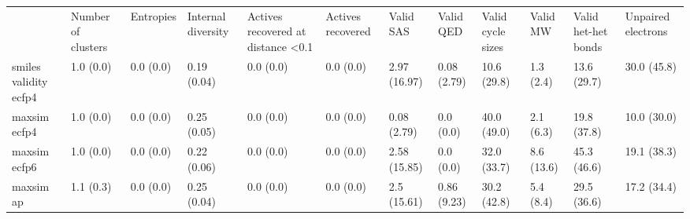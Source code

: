 \begin{tabular}{llllllllllll}
 & Number of clusters & Entropies & Internal diversity & Actives recovered at distance <0.1 & Actives recovered & Valid SAS & Valid QED & Valid cycle sizes & Valid MW & Valid het-het bonds & Unpaired electrons \\
smiles validity ecfp4 & {\cellcolor[HTML]{F6FCFD}} \color[HTML]{000000} 1.0 (0.0) & {\cellcolor[HTML]{F7FCFD}} \color[HTML]{000000} 0.0 (0.0) & {\cellcolor[HTML]{D8F0EF}} \color[HTML]{000000} 0.19 (0.04) & {\cellcolor[HTML]{F7FCFD}} \color[HTML]{000000} 0.0 (0.0) & {\cellcolor[HTML]{F7FCFD}} \color[HTML]{000000} 0.0 (0.0) & {\cellcolor[HTML]{F3FAFC}} \color[HTML]{000000} 2.97 (16.97) & {\cellcolor[HTML]{F7FCFD}} \color[HTML]{000000} 0.08 (2.79) & {\cellcolor[HTML]{E8F6FA}} \color[HTML]{000000} 10.6 (29.8) & {\cellcolor[HTML]{F5FBFD}} \color[HTML]{000000} 1.3 (2.4) & {\cellcolor[HTML]{E3F4F8}} \color[HTML]{000000} 13.6 (29.7) & {\cellcolor[HTML]{B8E4DB}} \color[HTML]{000000} 30.0 (45.8) \\
maxsim ecfp4 & {\cellcolor[HTML]{F6FCFD}} \color[HTML]{000000} 1.0 (0.0) & {\cellcolor[HTML]{F7FCFD}} \color[HTML]{000000} 0.0 (0.0) & {\cellcolor[HTML]{CDECE6}} \color[HTML]{000000} 0.25 (0.05) & {\cellcolor[HTML]{F7FCFD}} \color[HTML]{000000} 0.0 (0.0) & {\cellcolor[HTML]{F7FCFD}} \color[HTML]{000000} 0.0 (0.0) & {\cellcolor[HTML]{F7FCFD}} \color[HTML]{000000} 0.08 (2.79) & {\cellcolor[HTML]{F7FCFD}} \color[HTML]{000000} 0.0 (0.0) & {\cellcolor[HTML]{8FD4C2}} \color[HTML]{000000} 40.0 (49.0) & {\cellcolor[HTML]{F4FBFC}} \color[HTML]{000000} 2.1 (6.3) & {\cellcolor[HTML]{D7F0EE}} \color[HTML]{000000} 19.8 (37.8) & {\cellcolor[HTML]{E9F7FA}} \color[HTML]{000000} 10.0 (30.0) \\
maxsim ecfp6 & {\cellcolor[HTML]{F6FCFD}} \color[HTML]{000000} 1.0 (0.0) & {\cellcolor[HTML]{F7FCFD}} \color[HTML]{000000} 0.0 (0.0) & {\cellcolor[HTML]{D3EEEB}} \color[HTML]{000000} 0.22 (0.06) & {\cellcolor[HTML]{F7FCFD}} \color[HTML]{000000} 0.0 (0.0) & {\cellcolor[HTML]{F7FCFD}} \color[HTML]{000000} 0.0 (0.0) & {\cellcolor[HTML]{F4FBFC}} \color[HTML]{000000} 2.58 (15.85) & {\cellcolor[HTML]{F7FCFD}} \color[HTML]{000000} 0.0 (0.0) & {\cellcolor[HTML]{B0E1D6}} \color[HTML]{000000} 32.0 (33.7) & {\cellcolor[HTML]{EBF7FA}} \color[HTML]{000000} 8.6 (13.6) & {\cellcolor[HTML]{78CAB1}} \color[HTML]{000000} 45.3 (46.6) & {\cellcolor[HTML]{D8F0EF}} \color[HTML]{000000} 19.1 (38.3) \\
maxsim ap & {\cellcolor[HTML]{F6FCFD}} \color[HTML]{000000} 1.1 (0.3) & {\cellcolor[HTML]{F7FCFD}} \color[HTML]{000000} 0.0 (0.0) & {\cellcolor[HTML]{CDECE7}} \color[HTML]{000000} 0.25 (0.04) & {\cellcolor[HTML]{F7FCFD}} \color[HTML]{000000} 0.0 (0.0) & {\cellcolor[HTML]{F7FCFD}} \color[HTML]{000000} 0.0 (0.0) & {\cellcolor[HTML]{F4FBFC}} \color[HTML]{000000} 2.5 (15.61) & {\cellcolor[HTML]{F6FCFD}} \color[HTML]{000000} 0.86 (9.23) & {\cellcolor[HTML]{B7E4DA}} \color[HTML]{000000} 30.2 (42.8) & {\cellcolor[HTML]{F0F9FB}} \color[HTML]{000000} 5.4 (8.4) & {\cellcolor[HTML]{BAE5DC}} \color[HTML]{000000} 29.5 (36.6) & {\cellcolor[HTML]{DBF2F2}} \color[HTML]{000000} 17.2 (34.4) \\

\end{tabular}
